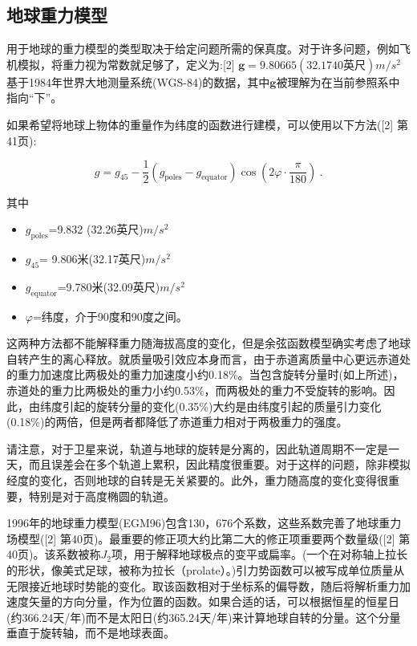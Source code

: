 \subsection{地球重力模型}

用于地球的重力模型的类型取决于给定问题所需的保真度。对于许多问题，例如飞机模拟，将重力视为常数就足够了，定义为:[2]
$\mathbf{g} =9.80665(32.1740\text{英尺}) m/s^2$
基于1984年世界大地测量系统(WGS-84)的数据，其中$\mathbf{g}$被理解为在当前参照系中指向“下”。

如果希望将地球上物体的重量作为纬度的函数进行建模，可以使用以下方法([2] 第41页):

$$g = g_{45} - \frac{1}{2} \left( g_{\text{poles}} - g_{\text{equator}} \right) \cos \left( 2 \varphi \cdot \frac{\pi}{180} \right)~.$$

其中

\begin{itemize}
\item $g_\text{poles}$=9.832 (32.26{英尺})$m/s^2$
\item $g_{45}$= 9.806米(32.17英尺)$m/s^2$
\item $g_\text{equator}$=9.780米(32.09英尺)$m/s^2$
\item $\varphi$=纬度，介于90度和90度之间。
\end{itemize}

这两种方法都不能解释重力随海拔高度的变化，但是余弦函数模型确实考虑了地球自转产生的离心释放。就质量吸引效应本身而言，由于赤道离质量中心更远赤道处的重力加速度比两极处的重力加速度小约0.18\%。当包含旋转分量时(如上所述)，赤道处的重力比两极处的重力小约0.53\%，而两极处的重力不受旋转的影响。因此，由纬度引起的旋转分量的变化(0.35\%)大约是由纬度引起的质量引力变化(0.18\%)的两倍，但是两者都降低了赤道重力相对于两极重力的强度。

请注意，对于卫星来说，轨道与地球的旋转是分离的，因此轨道周期不一定是一天，而且误差会在多个轨道上累积，因此精度很重要。对于这样的问题，除非模拟经度的变化，否则地球的自转是无关紧要的。此外，重力随高度的变化变得很重要，特别是对于高度椭圆的轨道。

1996年的地球重力模型(EGM96)包含130，676个系数，这些系数完善了地球重力场模型([2] 第40页)。最重要的修正项大约比第二大的修正项重要两个数量级([2] 第40页)。该系数被称$J_2$项，用于解释地球极点的变平或扁率。(一个在对称轴上拉长的形状，像美式足球，被称为拉长（prolate）。)引力势函数可以被写成单位质量从无限接近地球时势能的变化。取该函数相对于坐标系的偏导数，随后将解析重力加速度矢量的方向分量，作为位置的函数。如果合适的话，可以根据恒星的恒星日(约366.24天/年)而不是太阳日(约365.24天/年)来计算地球自转的分量。这个分量垂直于旋转轴，而不是地球表面。

